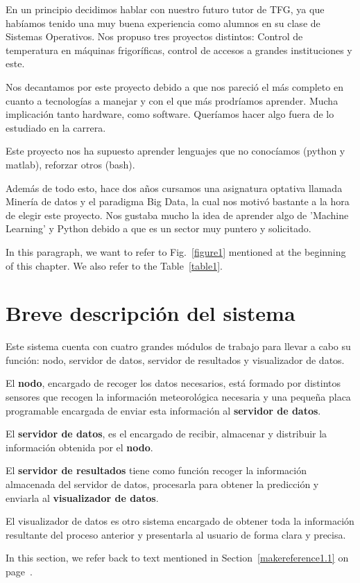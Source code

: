 En un principio decidimos hablar con nuestro futuro tutor de TFG, ya que habíamos tenido una muy buena experiencia como alumnos en su clase de Sistemas Operativos.
Nos propuso tres proyectos distintos: Control de temperatura en máquinas frigoríficas, control de accesos a grandes instituciones y este.

Nos decantamos por este proyecto debido a que nos pareció el más completo en cuanto a tecnologías a manejar y con el que más prodríamos aprender. Mucha implicación tanto hardware, como software. Queríamos hacer algo fuera de lo estudiado en la carrera.

Este proyecto nos ha supuesto aprender lenguajes que no conocíamos (python y matlab), reforzar otros (bash).

Además de todo esto, hace dos años cursamos una asignatura optativa llamada Minería de datos y el paradigma Big Data, la cual nos motivó bastante a la hora de elegir este proyecto. Nos gustaba mucho la idea de aprender algo de 'Machine Learning' y Python debido a que es un sector muy puntero y solicitado.

In this paragraph, we want to refer to Fig.~\ref{figure1}
mentioned at the beginning of this chapter.  We also refer to the
Table~\ref{table1}.

\section{Breve descripción del sistema}
\label{makereference1.2}

Este sistema cuenta con cuatro grandes módulos de trabajo para llevar a cabo su función: nodo, servidor de datos, servidor de resultados y visualizador de datos.

El \textbf{nodo}, encargado de recoger los datos necesarios, está formado por distintos sensores que recogen la información meteorológica necesaria y una pequeña placa programable encargada de enviar esta información al \textbf{servidor de datos}.

El \textbf{servidor de datos}, es el encargado de recibir, almacenar y distribuir la información obtenida por el \textbf{nodo}. 

El \textbf{servidor de resultados} tiene como función recoger la información almacenada del servidor de datos, procesarla para obtener la predicción y enviarla al \textbf{visualizador de datos}.

El visualizador de datos es otro sistema encargado de obtener toda la información resultante del proceso anterior y presentarla al usuario de forma clara y precisa.

In this section, we refer back to text mentioned in
Section~\ref{makereference1.1} on page~\pageref{makereference1.1}.



